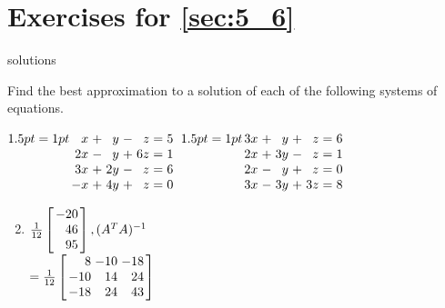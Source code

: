 \section*{Exercises for \ref{sec:5_6}}

\begin{Filesave}{solutions}
\end{Filesave}

\begin{multicols}{2}
\begin{ex}
Find the best approximation to a solution of each of the following systems of equations.

\begin{exenumerate}
\exitem $\arraycolsep=1pt
\begin{array}[t]{rlrlrcr}
 x & + &  y & - &  z & = & 5 \\
2x & - &  y & + & 6z & = & 1 \\
3x & + & 2y & - &  z & = & 6 \\
-x & + & 4y & + &  z & = & 0 \\
\end{array}$
\exitem $\arraycolsep=1pt
\begin{array}[t]{rlrlrcr}
3x & + &  y & + &  z & = & 6 \\
2x & + & 3y & - &  z & = & 1 \\
2x & - &  y & + &  z & = & 0 \\
3x & - & 3y & + & 3z & = & 8 \\
\end{array}$
\end{exenumerate}
\begin{sol}
\begin{enumerate}[label={\alph*.}]
\setcounter{enumi}{1}
\item $\frac{1}{12}
\leftB \begin{array}{r}
-20 \\
46 \\
95
\end{array} \rightB, (A^TA)^{-1}$ \\
$ = \frac{1}{12}
\leftB \begin{array}{rrr}
  8 & -10 & -18 \\
-10 &  14 &  24 \\
-18 &  24 &  43 
\end{array} \rightB$

\end{enumerate}
\end{sol}
\end{ex}


\end{multicols}
